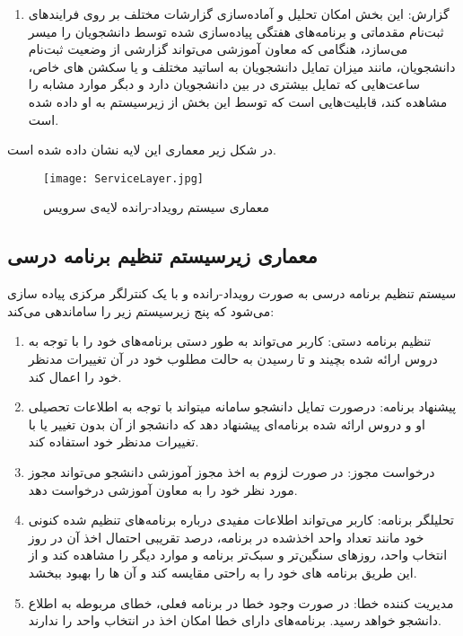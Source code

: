 \documentclass{report}
\begin{document}
\begin{enumerate}
\item
گزارش: 
این بخش امکان تحلیل و آماده‌سازی گزارشات مختلف بر روی فرایندهای ثبت‌نام مقدماتی و برنامه‌های هفتگی پیاده‌سازی شده توسط دانشجویان را میسر می‌سازد، هنگامی که معاون آموزشی می‌تواند گزارشی از وضعیت ثبت‌نام دانشجویان، مانند میزان تمایل دانشجویان به اساتید مختلف و یا سکشن های خاص، ساعت‌هایی که تمایل بیشتری در بین دانشجویان دارد و دبگر موارد مشابه را مشاهده کند، قابلیت‌هایی است که توسط این بخش از زیرسیستم به او داده شده است.


\end{enumerate}

در شکل زیر معماری این لایه نشان داده شده‌ است.

\begin{figure}[h!]
  \texttt{[image: ServiceLayer.jpg]}
  \caption{معماری سیستم رویداد-رانده لایه‌ی سرویس}
  \label{fig:1}
\end{figure}


\subsection{معماری زیرسیستم تنظیم برنامه درسی}
سیستم تنظیم برنامه درسی به صورت رویداد-رانده و با یک کنترلگر مرکزی پیاده سازی می‌شود که پنج زیرسیستم زیر را ساماندهی می‌کند:

\begin{enumerate}
\item
 تنظیم برنامه دستی: 
کاربر می‌تواند به طور دستی برنامه‌های خود را با توجه به دروس ارائه شده بچیند و تا رسیدن به حالت مطلوب خود در آن تغییرات مدنظر خود را اعمال کند.

\item
پیشنهاد برنامه: 
درصورت تمایل دانشجو سامانه میتواند با توجه به اطلاعات تحصیلی او و دروس ارائه شده برنامه‌ای پیشنهاد دهد که دانشجو از آن بدون تغییر یا با تغییرات مدنظر خود استفاده کند.

\item
درخواست مجوز: 
در صورت لزوم به اخذ مجوز آموزشی دانشجو می‌تواند مجوز مورد نظر خود را به معاون آموزشی درخواست دهد.

\item
تحلیلگر برنامه: 
کاربر می‌تواند اطلاعات مفیدی درباره برنامه‌های تنظیم شده کنونی خود مانند تعداد واحد اخذشده در برنامه،‌ درصد تقریبی احتمال اخذ آن در روز انتخاب واحد، روزهای سنگین‌تر و سبک‌تر برنامه و موارد دیگر را مشاهده کند و از این طریق برنامه های خود را به راحتی مقایسه کند و آن ها را بهبود ببخشد.

\item
مدیریت کننده خطا: 
در صورت وجود خطا در برنامه فعلی، خطای مربوطه به اطلاع دانشجو خواهد رسید. برنامه‌های دارای خطا امکان اخذ در انتخاب واحد را ندارند.


\end{enumerate}
\end{document}
